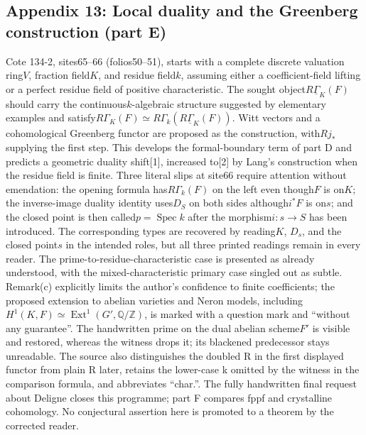 \documentclass[10pt,oneside]{book}
\begin{document}
\subsection*{Appendix 13: Local duality and the Greenberg construction (part E)}
Cote 134-2, sites65--66 (folios50--51), starts with a complete discrete valuation ring$V$, fraction field$K$, and residue field$k$, assuming either a coefficient-field lifting or a perfect residue field of positive characteristic. The sought object$R\underline\Gamma_K(F)$ should carry the continuous$k$-algebraic structure suggested by elementary examples and satisfy$R\Gamma_K(F)\simeq R\Gamma_k(R\underline\Gamma_K(F))$. Witt vectors and a cohomological Greenberg functor are proposed as the construction, with$Rj_*$ supplying the first step. This develops the formal-boundary term of part D and predicts a geometric duality shift[1], increased to[2] by Lang's construction when the residue field is finite. Three literal slips at site66 require attention without emendation: the opening formula has$R\Gamma_k(F)$ on the left even though$F$ is on$K$; the inverse-image duality identity uses$D_S$ on both sides although$i^*F$ is on$s$; and the closed point is then called$p=\operatorname{Spec}k$ after the morphism$i:s\to S$ has been introduced. The corresponding types are recovered by reading$K$, $D_s$, and the closed point$s$ in the intended roles, but all three printed readings remain in every reader. The prime-to-residue-characteristic case is presented as already understood, with the mixed-characteristic primary case singled out as subtle. Remark(c) explicitly limits the author's confidence to finite coefficients; the proposed extension to abelian varieties and Neron models, including$H^1(K,F)\simeq\operatorname{Ext}^1(G',\mathbb Q/\mathbb Z)$, is marked with a question mark and ``without any guarantee''. The handwritten prime on the dual abelian scheme$F'$ is visible and restored, whereas the witness drops it; its blackened predecessor stays unreadable. The source also distinguishes the doubled R in the first displayed functor from plain R later, retains the lower-case k omitted by the witness in the comparison formula, and abbreviates ``char.''. The fully handwritten final request about Deligne closes this programme; part F compares fppf and crystalline cohomology. No conjectural assertion here is promoted to a theorem by the corrected reader.
\end{document}
